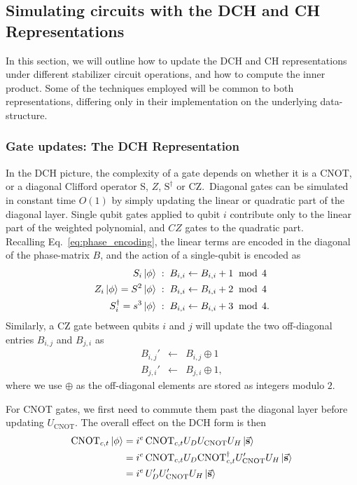 \subsection{Simulating circuits with the DCH and CH Representations}\label{sec:dch_ch_methods}
In this section, we will outline how to update the DCH and CH representations under different stabilizer circuit operations, and how to compute the inner product. Some of the techniques employed will be common to both representations, differing only in their implementation on the underlying data-structure.
\subsubsection{Gate updates: The DCH Representation}
In the DCH picture, the complexity of a gate depends on whether it is a CNOT, or a diagonal Clifford operator S, $Z$, $\text{S}^{\dagger}$ or CZ.\ Diagonal gates can be simulated in constant time $O(1)$ by simply updating the linear or quadratic part of the diagonal layer. Single qubit gates applied to qubit $i$ contribute only to the linear part of the weighted polynomial, and $CZ$ gates to the quadratic part.\\
Recalling Eq.~\ref{eq:phase_encoding}, the linear terms are encoded in the diagonal of the phase-matrix $B$, and the action of a single-qubit is encoded as
\begin{align}
S_{i}\ket{\phi} &\;:\;B_{i,i}\leftarrow B_{i,i} + 1\;\bmod\,4 \\
Z_{i}\ket{\phi} = S^{2}\ket{\phi} &\;:\;B_{i,i}\leftarrow B_{i,i} +2\;\bmod\,4 \\
S_{i}^{\dagger} = s^{3}\ket{\phi} & \;:\;B_{i,i}\leftarrow B_{i,i} + 3\;\bmod\,4. 
\end{align}
Similarly, a CZ gate between qubits $i$ and $j$ will update the two off-diagonal entries $B_{i,j}$ and $B_{j,i}$ as
\begin{equation}
\begin{array}{ccc}
B_{i,j}' & \leftarrow & B_{i,j}\oplus 1\\
B_{j,i}' & \leftarrow & B_{j,i}\oplus 1,
\end{array}
\end{equation}
where we use $\oplus$ as the off-diagonal elements are stored as integers modulo $2$.\par
For CNOT gates, we first need to commute them past the diagonal layer before updating $U_{\text{CNOT}}$. The overall effect on the DCH form is then
\begin{align}
\text{CNOT}_{c,t}\ket{\phi} &= i^{e}\,\text{CNOT}_{c,t}U_{D}U_{\text{CNOT}}U_{H} \ket{\va{s}}\nonumber \\
&= i^{e}\,\text{CNOT}_{c,t}U_{D}\text{CNOT}_{c,t}^{\dagger} U_{\text{CNOT}}' U_{H}\ket{\va{s}} \nonumber \\
&= i^{e}\,U_{D}'U_{\text{CNOT}}'U_{H}\ket{\va{s}}
\end{align}
